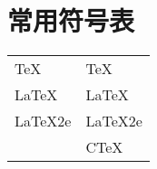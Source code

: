\chapter{常用符号表}
\begin{center}
	\begin{tabular}{p{7em}p{20em}}
		\TeX     & TeX     \\
		\LaTeX   & LaTeX   \\
		\LaTeX2e & LaTeX2e \\
		\CTeX    & CTeX    \\
	\end{tabular}
\end{center}
